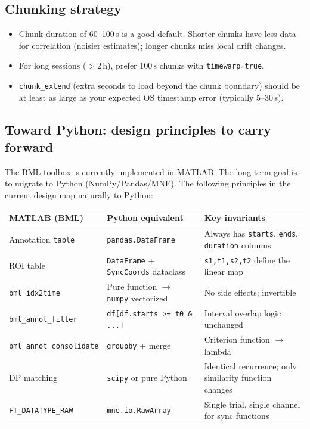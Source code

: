 \documentclass[11pt, a4paper]{article}
\begin{document}
\subsection{Chunking strategy}

\begin{itemize}
  \item Chunk duration of 60--100\,s is a good default. Shorter chunks have less data for correlation (noisier estimates); longer chunks miss local drift changes.
  \item For long sessions ($>$2\,h), prefer 100\,s chunks with \texttt{timewarp=true}.
  \item \texttt{chunk\_extend} (extra seconds to load beyond the chunk boundary) should be at least as large as your expected OS timestamp error (typically 5--30\,s).
\end{itemize}

\subsection{Toward Python: design principles to carry forward}

The BML toolbox is currently implemented in MATLAB. The long-term goal is to migrate to Python (NumPy/Pandas/MNE). The following principles in the current design map naturally to Python:

\begin{center}
\begin{tabular}{L{4.5cm} L{4.5cm} L{4cm}}
\toprule
\textbf{MATLAB (BML)} & \textbf{Python equivalent} & \textbf{Key invariants} \\
\midrule
Annotation \texttt{table} & \texttt{pandas.DataFrame} & Always has \texttt{starts}, \texttt{ends}, \texttt{duration} columns \\
ROI table & \texttt{DataFrame} + \texttt{SyncCoords} dataclass & \texttt{s1,t1,s2,t2} define the linear map \\
\texttt{bml\_idx2time} & Pure function $\to$ \texttt{numpy} vectorized & No side effects; invertible \\
\texttt{bml\_annot\_filter} & \texttt{df[df.starts >= t0 \& ...]} & Interval overlap logic unchanged \\
\texttt{bml\_annot\_consolidate} & \texttt{groupby} + merge & Criterion function $\to$ lambda \\
DP matching & \texttt{scipy} or pure Python & Identical recurrence; only similarity function changes \\
\texttt{FT\_DATATYPE\_RAW} & \texttt{mne.io.RawArray} & Single trial, single channel for sync functions \\
\bottomrule
\end{tabular}
\end{center}
\end{document}
